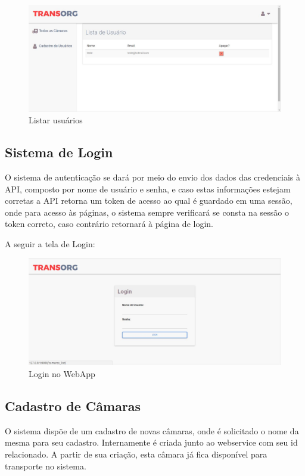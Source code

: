 \begin{figure}[H]
\centering
\includegraphics[width=16cm]{figuras/listaUsuarios_software.JPG}
\caption{Listar usuários}
\end{figure}

\subsection{Sistema de Login}
	O sistema de autenticação se dará por meio do envio dos dados das credenciais à API, composto por nome de usuário e senha, e caso estas informações estejam corretas a API retorna um token de acesso ao qual é guardado em uma sessão, onde para acesso às páginas, o sistema sempre verificará se consta na sessão o token correto, caso contrário retornará à página de login. 
	
	A seguir a tela de Login:

\begin{figure}[H]
\centering
\includegraphics[width=16cm]{figuras/login_software.JPG}
\caption{Login no WebApp}
\end{figure}

\subsection{Cadastro de Câmaras}
	O sistema dispõe de um cadastro de novas câmaras, onde é solicitado o nome da mesma para seu cadastro. Internamente é criada junto ao webservice com seu id relacionado. A partir de sua criação, esta câmara já fica disponível para transporte no sistema.
	
